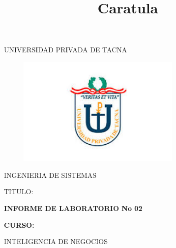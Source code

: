 \documentclass[12pt,letterpaper]{article}
\begin{document}
%


\title{Caratula}

\begin{titlepage}
\begin{center}
\large{UNIVERSIDAD PRIVADA DE TACNA}\\
\vspace*{-0.025in}
\begin{figure}[htb]
\begin{center}
\includegraphics[width=8cm]{./Imagenes/logo}
\end{center}
\end{figure}
\vspace*{0.15in}
INGENIERIA DE SISTEMAS  \\

\vspace*{0.5in}
\begin{large}
TITULO:\\
\end{large}

\vspace*{0.1in}
\begin{Large}
\textbf{INFORME DE LABORATORIO No 02} \\
\end{Large}

\vspace*{0.3in}
\begin{Large}
\textbf{CURSO:} \\
\end{Large}

\vspace*{0.1in}
\begin{large}
INTELIGENCIA DE NEGOCIOS\\
\end{large}


\end{center}
\end{titlepage}
\end{document}
